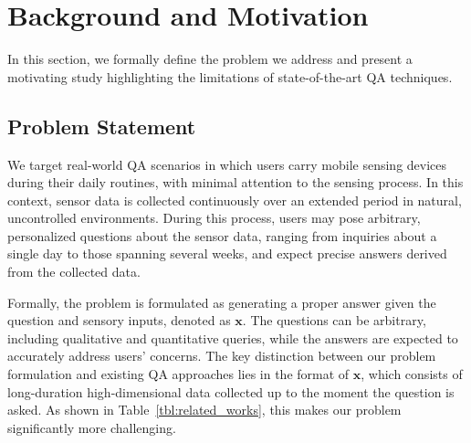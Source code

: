 \section{Background and Motivation}
\label{sec:motivation}

In this section, we formally define the problem we address and present a motivating study highlighting the limitations of state-of-the-art QA techniques.






\subsection{Problem Statement}
\label{sec:problem-statement}


We target real-world QA scenarios in which users carry mobile sensing devices during their daily routines, with minimal attention to the sensing process. In this context, sensor data is collected continuously over an extended period in natural, uncontrolled environments. During this process, users may pose arbitrary, personalized questions about the sensor data, ranging from inquiries about a single day to those spanning several weeks, and expect precise answers derived from the collected data.

Formally, the problem is formulated as generating a proper answer given the question and sensory inputs, denoted as $\mathbf{x}$.
The questions can be arbitrary, including qualitative and quantitative queries, while the answers are expected to accurately address users' concerns.
The key distinction between our problem formulation and existing QA approaches lies in the format of $\mathbf{x}$, which consists of long-duration high-dimensional data collected up to the moment the question is asked. As shown in Table~\ref{tbl:related_works}, this makes our problem significantly more challenging.

